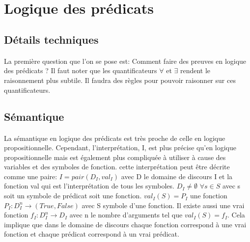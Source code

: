 % 
% 
% 
% 

\section{Logique des prédicats}
\subsection{Détails techniques}
\paragraph{}
La première question que l'on se pose est: Comment faire des preuves en logique des prédicats ? Il faut noter que les quantificateurs $\forall$ et $\exists$ rendent le raisonnement plus subtile. Il faudra des règles pour pouvoir raisonner sur ces quantificateurs.
\subsection{Sémantique}
\paragraph{}
La sémantique en logique des prédicats est très proche de celle en logique propositionnelle. Cependant, l'interprétation, I, est plus précise qu'en logique propositionnelle mais est également plus compliquée à utiliser à cause des variables et des symboles de fonction. cette interprétation peut être décrite comme une paire: $I = pair(D_{I}, val_{I}) $ avec D le domaine de discours I et la fonction val qui est l'interprétation de tous les symboles. $D_{I} \ne \emptyset $ $ \forall s \in S$ avec s soit un symbole de prédicat soit une fonction. $val_{I}(S) = P_{I}$ une fonction $P_{I}:D_{I}^{n} \rightarrow (True,False)$ avec S symbole d'une fonction. Il existe aussi une vrai fonction $f_{I}:D_{I}^{n} \rightarrow D_{I}$ avec n le nombre d'arguments tel que $val_{I}(S) = f_{I} $. Cela implique que dans le domaine de discours chaque fonction correspond à une vrai fonction et chaque prédicat correspond à un vrai prédicat. 
